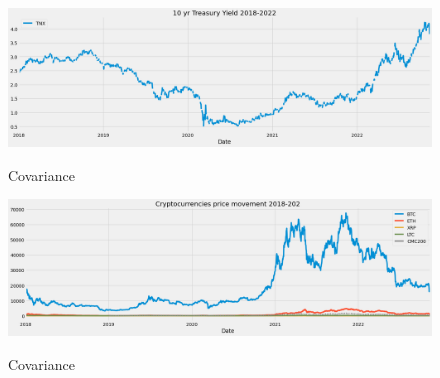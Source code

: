\begin{figure}
    \centering
    \caption{Covariance}
    \includegraphics[width=\textwidth,height=\textheight,keepaspectratio]{images/movement_treasury.png}
    \label{fig:mov_treasury}
\end{figure}

\begin{figure}
    \centering
    \caption{Covariance}
    \includegraphics[width=\textwidth,height=\textheight,keepaspectratio]{images/movement_crypto.png}
    \label{fig:mov_crypto}
\end{figure}